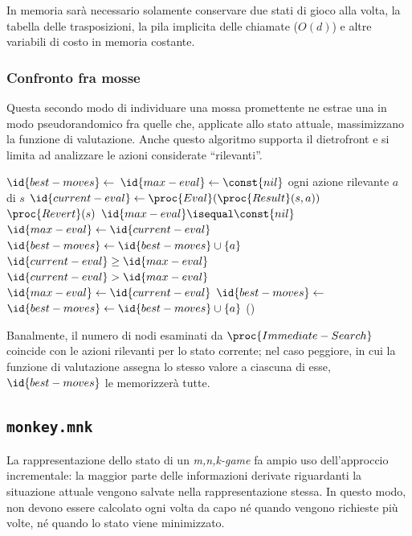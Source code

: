 \documentclass{article}
\begin{document}
In memoria sarà necessario solamente conservare due stati di gioco alla volta,
la tabella delle trasposizioni, la pila implicita delle chiamate ($O(d)$) e
altre variabili di costo in memoria costante.

\subsubsection{Confronto fra mosse}

Questa secondo modo di individuare una mossa promettente ne estrae una in modo
pseudorandomico fra quelle che, applicate allo stato attuale, massimizzano la
funzione di valutazione. Anche questo algoritmo supporta il dietrofront e si
limita ad analizzare le azioni considerate ``rilevanti''.

\begin{codebox}
  \li  $\id{best-moves} \gets$
       {\emph{}}
  \li  $\id{max-eval} \gets \const{nil}$
  \li \For ogni azione rilevante $a$ di $s$
  \li   \Do
          $\id{current-eval} \gets \proc{Eval}(\proc{Result}(s, a))$
  \li     $\proc{Revert}(s)$
  \li     \If $\id{max-eval} \isequal \const{nil}$
  \li       \Then
              $\id{max-eval} \gets \id{current-eval}$
  \li         $\id{best-moves} \gets \id{best-moves} \cup \{ a \}$
  \li     \ElseIf $\id{current-eval} \geq \id{max-eval}$
  \li       \Then
              \If $\id{current-eval} > \id{max-eval}$
  \li           \Then
                  $\id{max-eval} \gets \id{current-eval}$
  \li             $\id{best-moves} \gets$
                  {\emph{}}
                \End
  \li         $\id{best-moves} \gets \id{best-moves} \cup \{ a \}$
          \End
        \End
  \li  \Return {}()
\end{codebox}

Banalmente, il numero di nodi esaminati da $\proc{Immediate-Search}$ coincide
con le azioni rilevanti per lo stato corrente; nel caso peggiore, in cui la
funzione di valutazione assegna lo stesso valore a ciascuna di esse,
$\id{best-moves}$ le memorizzerà tutte.

\subsection{\texttt{monkey.mnk}}

La rappresentazione dello stato di un \emph{m,n,k-game} fa ampio uso
dell'approccio incrementale: la maggior parte delle informazioni derivate
riguardanti la situazione attuale vengono salvate nella rappresentazione stessa.
In questo modo, non devono essere calcolato ogni volta da capo né quando vengono
richieste più volte, né quando lo stato viene minimizzato.
\end{document}
